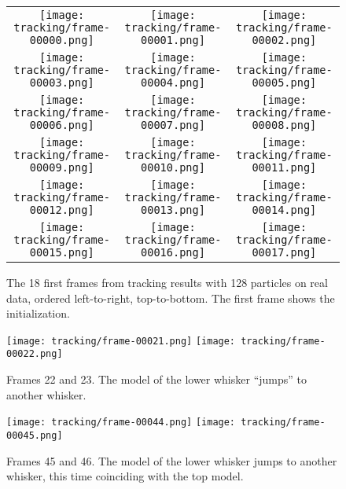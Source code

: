 \begin{figure}[p]
  \centering
  \begin{tabular}{ccc}
    \texttt{[image: tracking/frame-00000.png]} &
    \texttt{[image: tracking/frame-00001.png]} &
    \texttt{[image: tracking/frame-00002.png]}\\
    \texttt{[image: tracking/frame-00003.png]} &
    \texttt{[image: tracking/frame-00004.png]} &
    \texttt{[image: tracking/frame-00005.png]}\\
    \texttt{[image: tracking/frame-00006.png]} &
    \texttt{[image: tracking/frame-00007.png]} &
    \texttt{[image: tracking/frame-00008.png]}\\
    \texttt{[image: tracking/frame-00009.png]} &
    \texttt{[image: tracking/frame-00010.png]} &
    \texttt{[image: tracking/frame-00011.png]}\\
    \texttt{[image: tracking/frame-00012.png]} &
    \texttt{[image: tracking/frame-00013.png]} &
    \texttt{[image: tracking/frame-00014.png]}\\
    \texttt{[image: tracking/frame-00015.png]} &
    \texttt{[image: tracking/frame-00016.png]} &
    \texttt{[image: tracking/frame-00017.png]}\\
  \end{tabular}
  \caption{The 18 first frames from tracking results with 128
    particles on real data, ordered left-to-right, top-to-bottom. The
    first frame shows the initialization.}
  \label{fig:rtracking}
\end{figure}

\begin{figure}[p]
  \centering
  \texttt{[image: tracking/frame-00021.png]}
  \texttt{[image: tracking/frame-00022.png]}
  \caption{Frames 22 and 23. The model of the lower whisker ``jumps''
    to another whisker.}
  \label{fig:rtracking-jump}
\end{figure}

\begin{figure}[p]
  \centering
  \texttt{[image: tracking/frame-00044.png]}
  \texttt{[image: tracking/frame-00045.png]}
  \caption{Frames 45 and 46. The model of the lower whisker jumps to
    another whisker, this time coinciding with the top model.}
  \label{fig:rtracking-jump-coincide}
\end{figure}

